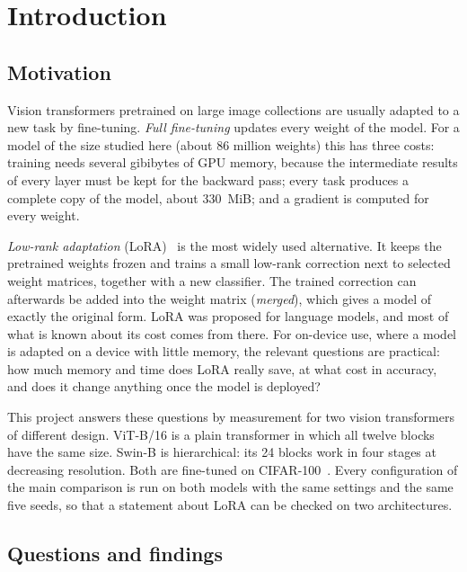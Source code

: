 \chapter{Introduction}
\label{ch:intro}

\section{Motivation}

Vision transformers pretrained on large image collections are usually adapted to a new task by fine-tuning.
\emph{Full fine-tuning} updates every weight of the model. For a model of the size studied here (about 86 million
weights) this has three costs: training needs several gibibytes of GPU memory, because the intermediate results of
every layer must be kept for the backward pass; every task produces a complete copy of the model, about 330~MiB; and
a gradient is computed for every weight.

\emph{Low-rank adaptation} (LoRA)~\cite{hu2022lora} is the most widely used alternative. It keeps the pretrained
weights frozen and trains a small low-rank correction next to selected weight matrices, together with a new
classifier. The trained correction can afterwards be added into the weight matrix (\emph{merged}), which gives a
model of exactly the original form. LoRA was proposed for language models, and most of what is known about its cost
comes from there. For on-device use, where a model is adapted on a device with little memory, the relevant questions
are practical: how much memory and time does LoRA really save, at what cost in accuracy, and does it change anything
once the model is deployed?

This project answers these questions by measurement for two vision transformers of different design. ViT-B/16
\cite{dosovitskiy2021vit} is a plain transformer in which all twelve blocks have the same size. Swin-B
\cite{liu2021swin} is hierarchical: its 24 blocks work in four stages at decreasing resolution. Both are fine-tuned
on CIFAR-100~\cite{krizhevsky2009cifar}. Every configuration of the main comparison is run on both models with the
same settings and the same five seeds, so that a statement about LoRA can be checked on two architectures.

\section{Questions and findings}

